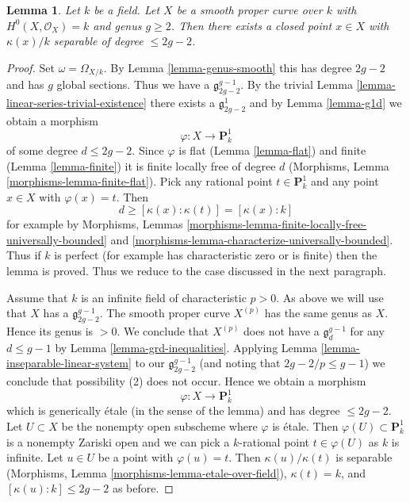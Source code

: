 \documentclass{stacks-project}
\theoremstyle{plain}
\newtheorem{lemma}[subsection]{Lemma}
\theoremstyle{definition}
\theoremstyle{remark}
\numberwithin{equation}{subsection}
\begin{document}
\begin{lemma}
\label{lemma-point-over-separable-extension}
Let $k$ be a field. Let $X$ be a smooth proper curve over $k$
with $H^0(X, \mathcal{O}_X) = k$ and genus $g \geq 2$.
Then there exists a closed point $x \in X$ with
$\kappa(x)/k$ separable of degree $\leq 2g - 2$.
\end{lemma}

\begin{proof}
Set $\omega = \Omega_{X/k}$. By
Lemma \ref{lemma-genus-smooth} this has degree $2g - 2$
and has $g$ global sections. Thus we have a $\mathfrak g^{g - 1}_{2g - 2}$.
By the trivial Lemma \ref{lemma-linear-series-trivial-existence}
there exists a $\mathfrak g^1_{2g - 2}$
and by Lemma \ref{lemma-g1d} we obtain a morphism
$$
\varphi : X \longrightarrow \mathbf{P}^1_k
$$
of some degree $d \leq 2g - 2$. Since $\varphi$ is flat
(Lemma \ref{lemma-flat}) and finite
(Lemma \ref{lemma-finite})
it is finite locally free of degree $d$
(Morphisms, Lemma \ref{morphisms-lemma-finite-flat}).
Pick any rational point $t \in \mathbf{P}^1_k$
and any point $x \in X$ with $\varphi(x) = t$.
Then
$$
d \geq [\kappa(x) : \kappa(t)] = [\kappa(x) : k]
$$
for example by
Morphisms, Lemmas \ref{morphisms-lemma-finite-locally-free-universally-bounded}
and \ref{morphisms-lemma-characterize-universally-bounded}.
Thus if $k$ is perfect (for example has characteristic zero
or is finite) then the lemma is proved. Thus we reduce to the
case discussed in the next paragraph.

\medskip\noindent
Assume that $k$ is an infinite field of characteristic $p > 0$.
As above we will use that $X$ has a $\mathfrak g^{g - 1}_{2g - 2}$.
The smooth proper curve $X^{(p)}$ has the same genus as $X$.
Hence its genus is $> 0$. We conclude that $X^{(p)}$ does not have a
$\mathfrak g^{g - 1}_d$ for any $d \leq g - 1$ by
Lemma \ref{lemma-grd-inequalities}.
Applying Lemma \ref{lemma-inseparable-linear-system}
to our $\mathfrak g^{g - 1}_{2g - 2}$ (and noting that $2g - 2/p \leq g - 1$)
we conclude that possibility (2) does not occur. Hence we obtain a morphism
$$
\varphi : X \longrightarrow \mathbf{P}^1_k
$$
which is generically \'etale (in the sense of the lemma)
and has degree $\leq 2g - 2$. Let $U \subset X$ be the nonempty
open subscheme where $\varphi$ is \'etale. Then
$\varphi(U) \subset \mathbf{P}^1_k$ is a nonempty Zariski open
and we can pick a $k$-rational point $t \in \varphi(U)$ as $k$ is infinite.
Let $u \in U$ be a point with $\varphi(u) = t$.
Then $\kappa(u)/\kappa(t)$ is separable
(Morphisms, Lemma \ref{morphisms-lemma-etale-over-field}),
$\kappa(t) = k$, and $[\kappa(u) : k] \leq 2g - 2$ as before.
\end{proof}
\end{document}
